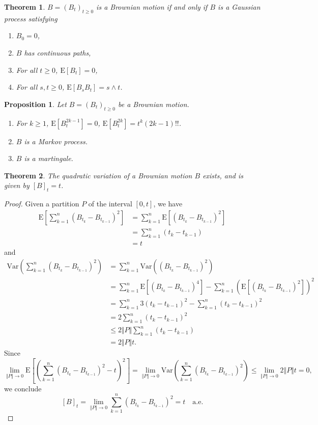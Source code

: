 \documentclass{article}
\newtheorem{proposition}{Proposition}[section]
\newtheorem{theorem}{Theorem}[section]
\theoremstyle{nonumberplain}
\newtheorem{proof}{Proof.}
\begin{document}
\begin{theorem}
	$B=(B_t)_{t\ge0}$ is a Brownian motion if and only if $B$ is a Gaussian process satisfying
	\begin{enumerate}
		\item $B_0=0$,
		\item $B$ has continuous paths,
		\item For all $t\ge0$, $\mathrm{E}[B_t]=0$,
		\item For all $s,t\ge0$, $\mathrm{E}[B_sB_t]=s\wedge t$.
	\end{enumerate}
\end{theorem}
\begin{proposition}
	Let $B=(B_t)_{t\ge0}$ be a Brownian motion.
	\begin{enumerate}
	\item For $k\ge1$, $\mathrm{E}[B_t^{2k-1}]=0$, $\mathrm{E}[B_t^{2k}]=t^{k}(2k-1)!!$.
	\item $B$ is a Markov process. 
	\item $B$ is a martingale.
	\end{enumerate}
\end{proposition}

\begin{theorem}
	The quadratic variation of a Brownian motion $B$ exists, and is given by $[B]_t = t$. 
\end{theorem}
\begin{proof} 
	Given a partition $P$ of the interval $[0,t]$, we have
	\[
	\begin{aligned}
	\mathrm{E}\left[\sum _{k=1}^{n}(B_{t_{k}}-B_{t_{k-1}})^{2}\right]&=\sum _{k=1}^{n}\mathrm{E}\left[(B_{t_{k}}-B_{t_{k-1}})^{2}\right]\\
	&=\sum _{k=1}^{n}(t_{k}-t_{k-1})\\
	&=t
    \end{aligned}
    \]
    and
    \[
    \begin{aligned}
	\mathrm{Var}\left(\sum _{k=1}^{n}(B_{t_{k}}-B_{t_{k-1}})^{2}\right)&=\sum _{k=1}^{n}\mathrm{Var}\left((B_{t_{k}}-B_{t_{k-1}})^{2}\right)\\
	&=\sum _{k=1}^{n}\mathrm{E}\left[(B_{t_{k}}-B_{t_{k-1}})^{4}\right]-\sum _{k=1}^{n}\left(\mathrm{E}\left[\left(B_{t_{k}}-B_{t_{k-1}}\right)^{2}\right]\right)^{2}\\
	&=\sum_{k=1}^{n}3(t_{k}-t_{k-1})^2-\sum _{k=1}^{n}\left(t_{k}-t_{k-1}\right)^{2}\\
	&=2\sum_{k=1}^{n}(t_{k}-t_{k-1})^2\\
	&\le 2\Vert P\Vert\sum_{k=1}^{n}(t_{k}-t_{k-1})\\
	&= 2\Vert P\Vert t.
	\end{aligned}
	\]
	Since
	\[
	\lim\limits_{\Vert P\Vert\to0 }\mathrm{E}\left[\left(\sum _{k=1}^{n}(B_{t_{k}}-B_{t_{k-1}})^{2}-t\right)^2\right]=\lim\limits_{\Vert P\Vert \to0}\mathrm{Var}\left(\sum _{k=1}^{n}(B_{t_{k}}-B_{t_{k-1}})^{2}\right)\le \lim\limits_{\Vert P\Vert\to0 }2\Vert P\Vert t=0,
	\]
	we conclude 
	\[
	[B]_t=\lim_{\Vert P\Vert \rightarrow 0}\sum _{k=1}^{n}(B_{t_{k}}-B_{t_{k-1}})^{2}=t\quad\text{a.e.}
	\]
\end{proof}
\newpage
\end{document}
